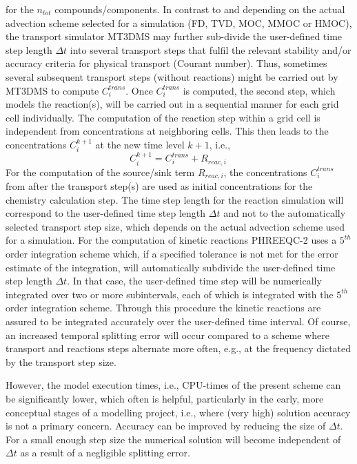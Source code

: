 for the $n_{tot}$ compounds/components. In contrast to
\cite[]{walt94a} and depending on the actual advection scheme
selected for a simulation (FD, TVD, MOC, MMOC or HMOC), the
transport simulator MT3DMS may further sub-divide the user-defined
time step length $\Delta t$ into several transport steps that
fulfil the relevant stability and/or accuracy criteria for
physical transport (Courant number). Thus, sometimes several
subsequent transport steps (without reactions) might be carried
out by MT3DMS to compute $C_i^{trans}$. Once $C_i^{trans}$ is
computed, the second step, which models the reaction(s), will be
carried out in a sequential manner for each grid cell
individually. The computation of the reaction step within a grid
cell is independent from concentrations at neighboring cells. This
then leads to the concentrations $C_i^{k+1}$ at the new time level
$k+1$, i.e.,
\begin{equation}
C_i^{k+1} = C_i^{trans} + R_{reac,i}\ \label{eq:seq_2}
\end{equation}
For the computation of the source/sink term $R_{reac,i}$, the
concentrations $C_i^{trans}$ from after the transport step(s) are
used as initial concentrations for the chemistry calculation step.
The time step length for the reaction simulation will correspond
to the user-defined time step length $\Delta t$ and not to the
automatically selected transport step size, which depends on the
actual advection scheme used for a simulation. For the computation
of kinetic reactions PHREEQC-2 uses a $5^{th}$ order integration
scheme \cite[]{fehlberg69} which, if a specified tolerance is not
met for the error estimate of the integration, will automatically
subdivide the user-defined time step length $\Delta t$. In that
case, the user-defined time step will be numerically integrated
over two or more subintervals, each of which is integrated with
the $5^{th}$ order integration scheme. Through this procedure the
kinetic reactions are assured to be integrated accurately over the
user-defined time interval. Of course, an increased temporal
splitting error will occur compared to a scheme where transport
and reactions steps alternate more often, e.g., at the frequency
dictated by the transport step size.

However, the model execution times, i.e., CPU-times of the present
scheme can be significantly lower, which often is helpful,
particularly in the early, more conceptual stages of a modelling
project, i.e., where (very high) solution accuracy is not a
primary concern. Accuracy can be improved by reducing the size of
$\Delta t$. For a small enough step size the numerical solution
will become independent of $\Delta t$ as a result of a negligible
splitting error.

